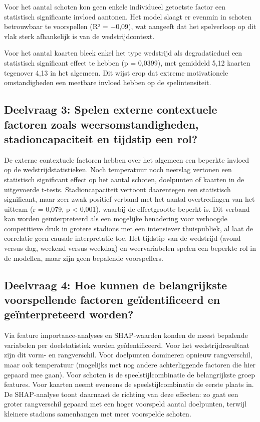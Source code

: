 \vspace{5pt}

Voor het aantal schoten kon geen enkele individueel getoetste factor een statistisch significante invloed aantonen.
Het model slaagt er evenmin in schoten betrouwbaar te voorspellen (R² = $-$0,09), wat aangeeft dat het spelverloop
op dit vlak sterk afhankelijk is van de wedstrijdcontext.

\vspace{5pt}

Voor het aantal kaarten bleek enkel het type wedstrijd als degradatieduel een statistisch significant effect te hebben (p = 0,0399),
met gemiddeld 5,12 kaarten tegenover 4,13 in het algemeen. Dit wijst erop dat extreme motivationele omstandigheden
een meetbare invloed hebben op de spelintensiteit.

\subsection*{Deelvraag 3: Spelen externe contextuele factoren zoals weersomstandigheden, stadioncapaciteit en tijdstip een rol?}

De externe contextuele factoren hebben over het algemeen een beperkte invloed op de wedstrijdstatistieken.
Noch temperatuur noch neerslag vertonen een statistisch significant effect op het aantal schoten, doelpunten of kaarten in de uitgevoerde t-tests. 
Stadioncapaciteit vertoont daarentegen een statistisch significant, 
maar zeer zwak positief verband met het aantal overtredingen van het uitteam (r = 0,079, p < 0,001), 
waarbij de effectgrootte beperkt is. 
Dit verband kan worden geïnterpreteerd als een mogelijke benadering voor verhoogde competitieve druk in grotere stadions met een intensiever thuispubliek, 
al laat de correlatie geen causale interpretatie toe. Het tijdstip van de wedstrijd (avond versus dag, weekend versus weekdag)
en weervariabelen spelen een beperkte rol in de modellen, maar zijn geen bepalende voorspellers.

\subsection*{Deelvraag 4: Hoe kunnen de belangrijkste voorspellende factoren geïdentificeerd en geïnterpreteerd worden?}

Via feature importance-analyses en SHAP-waarden konden de meest bepalende variabelen per doelstatistiek
worden geïdentificeerd. Voor het wedstrijdresultaat zijn dit vorm- en rangverschil. Voor doelpunten
domineren opnieuw rangverschil, maar ook temperatuur (mogelijks met nog andere achterliggende factoren die hier gepaard mee gaan). 
Voor schoten is de speelstijlcombinatie de belangrijkste groep features. Voor kaarten neemt eveneens de speelstijlcombinatie de eerste plaats in.
De SHAP-analyse toont daarnaast de richting van deze effecten: zo gaat een groter rangverschil gepaard
met een hoger voorspeld aantal doelpunten, terwijl kleinere stadions samenhangen met meer voorspelde schoten.

